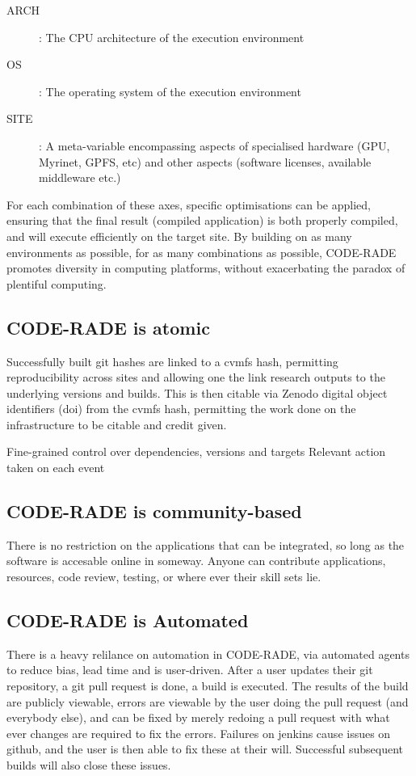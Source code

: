 \documentclass[a4paper]{jpconf}
\begin{document}
\begin{description}
	\item[ARCH]: The CPU architecture of the execution environment
	\item[OS]: The operating system of the execution environment
    \item[SITE]: A meta-variable encompassing aspects of specialised hardware (GPU, Myrinet, GPFS,
        etc) and other aspects (software licenses, available middleware etc.)
\end{description}

For each combination of these axes, specific optimisations can be applied, ensuring that the final
result (compiled application) is both properly compiled, and will execute efficiently on the target
site.
By building on as many environments as possible, for as many combinations as possible, CODE-RADE
promotes diversity in computing platforms, without exacerbating the paradox of plentiful computing.

\subsection{CODE-RADE is atomic}
Successfully built git hashes are linked to a cvmfs hash, permitting reproducibility across sites and 
allowing one the link research outputs to the underlying versions and builds. This is then citable via
Zenodo digital object identifiers (doi) from the cvmfs hash, permitting the work done on the 
infrastructure to be citable and credit given.

Fine-grained control over dependencies, versions and targets
Relevant action taken on each event

\subsection{CODE-RADE is community-based}
There is no restriction on the applications that can be integrated, so long as the software is accesable
online in someway. Anyone can contribute applications, resources, code review, testing, or
where ever their skill sets lie. 

\subsection{CODE-RADE is Automated}

There is a heavy relilance on automation in CODE-RADE, via automated agents to reduce bias, lead time
and is user-driven.
After a user updates their git repository, a git pull request is done, a build is executed. 
The results of the build are publicly viewable, 
errors are viewable by the user doing the pull request (and everybody else), and can be fixed
by merely redoing a pull request with what ever changes are required to fix the errors. 
Failures on jenkins cause issues on github, and the user is then able to fix these at their will.
Successful subsequent builds will also close these issues.
\end{document}
